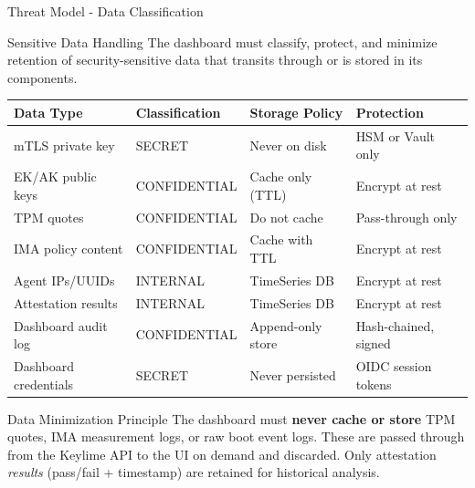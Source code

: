 \begin{frame}{Threat Model - Data Classification}
  \begin{block}{Sensitive Data Handling}
    \scriptsize
    The dashboard must classify, protect, and minimize retention of security-sensitive data
    that transits through or is stored in its components.
  \end{block}

  \vspace{0.1cm}

  \tiny
  \begin{center}
    \begin{tabular}{|p{2.5cm}|l|p{2.5cm}|p{3cm}|}
      \hline
      \textbf{Data Type} & \textbf{Classification} & \textbf{Storage Policy} & \textbf{Protection} \\
      \hline
      \hline
      mTLS private key & \textcolor{dangered}{SECRET} & Never on disk & HSM or Vault only \\
      \hline
      EK/AK public keys & \textcolor{warningyellow}{CONFIDENTIAL} & Cache only (TTL) & Encrypt at rest \\
      \hline
      TPM quotes & \textcolor{warningyellow}{CONFIDENTIAL} & Do not cache & Pass-through only \\
      \hline
      IMA policy content & \textcolor{warningyellow}{CONFIDENTIAL} & Cache with TTL & Encrypt at rest \\
      \hline
      Agent IPs/UUIDs & \textcolor{infoblue}{INTERNAL} & TimeSeries DB & Encrypt at rest \\
      \hline
      Attestation results & \textcolor{infoblue}{INTERNAL} & TimeSeries DB & Encrypt at rest \\
      \hline
      Dashboard audit log & \textcolor{warningyellow}{CONFIDENTIAL} & Append-only store & Hash-chained, signed \\
      \hline
      Dashboard credentials & \textcolor{dangered}{SECRET} & Never persisted & OIDC session tokens \\
      \hline
    \end{tabular}
  \end{center}

  \vspace{0.1cm}

  \begin{alertblock}{Data Minimization Principle}
    \scriptsize
    The dashboard must \textbf{never cache or store} TPM quotes, IMA measurement logs,
    or raw boot event logs. These are passed through from the Keylime API to the UI
    on demand and discarded. Only attestation \textit{results} (pass/fail + timestamp)
    are retained for historical analysis.
  \end{alertblock}
\end{frame}
